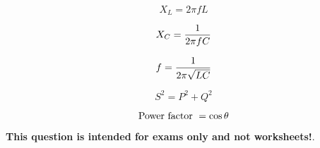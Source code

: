 

\vskip 10pt

$$X_L = 2 \pi f L$$

\vskip 10pt

$$X_C = {1 \over {2 \pi f C}}$$

\vskip 10pt

$$f = {1 \over {2 \pi \sqrt{L C}}}$$

\vskip 10pt

$$S^2 = P^2 + Q^2$$

\vskip 10pt

$$\hbox{Power factor } = \cos \theta$$














{\bf This question is intended for exams only and not worksheets!}.



